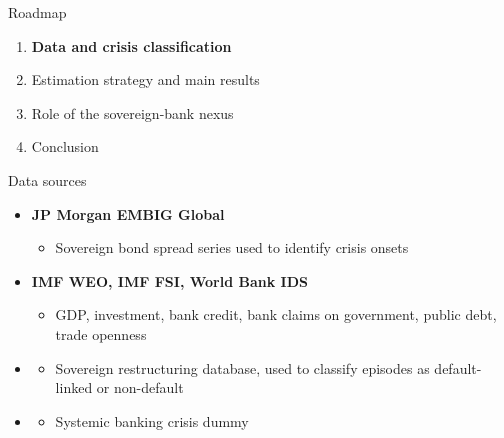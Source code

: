 \documentclass[aspectratio=169]{beamer}
\begin{document}
\begin{frame}{Roadmap}
  \begin{enumerate}
    \item \textbf{Data and crisis classification}
    \item Estimation strategy and main results
    \item Role of the sovereign-bank nexus
    \item Conclusion
  \end{enumerate}
\end{frame}

\begin{frame}{Data sources}
  \begin{itemize}
    \item \textbf{JP Morgan EMBIG Global}
    \begin{itemize}
      \item Sovereign bond spread series used to identify crisis onsets
    \end{itemize}
    \item \textbf{IMF WEO, IMF FSI, World Bank IDS}
    \begin{itemize}
      \item GDP, investment, bank credit, bank claims on government, public
      debt, trade openness
    \end{itemize}
    \item \textbf{\citet{asonuma2016sovereign}}
    \begin{itemize}
      \item Sovereign restructuring database, used to classify episodes as
      default-linked or non-default
    \end{itemize}
    \item \textbf{\citet{laeven2013systemic,laeven2026systemic}}
    \begin{itemize}
      \item Systemic banking crisis dummy
    \end{itemize}
  \end{itemize}
\end{frame}
\end{document}
